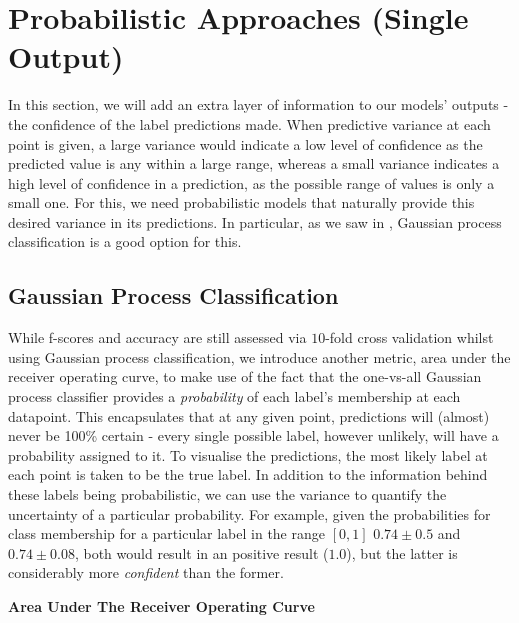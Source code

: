 \section{Probabilistic Approaches (Single Output)}

In this section, we will add an extra layer of information to our models' outputs - the confidence of the label predictions made. When predictive variance at each point is given, a large variance would indicate a low level of confidence as the predicted value is any within a large range, whereas a small variance indicates a high level of confidence in a prediction, as the possible range of values is only a small one. For this, we need probabilistic models that naturally provide this desired variance in its predictions. In particular, as we saw in , Gaussian process classification is a good option for this.

\subsection{Gaussian Process Classification}

While f-scores and accuracy are still assessed via $10$-fold cross validation whilst using Gaussian process classification, we introduce another metric, area under the receiver operating curve, to make use of the fact that the one-vs-all Gaussian process classifier provides a \textit{probability} of each label's membership at each datapoint. This encapsulates that at any given point, predictions will (almost) never be 100\% certain - every single possible label, however unlikely, will have a probability assigned to it. To visualise the predictions, the most likely label at each point is taken to be the true label. In addition to the information behind these labels being probabilistic, we can use the variance to quantify the uncertainty of a particular probability. For example, given the probabilities for class membership for a particular label in the range $[0,1]$ $0.74 \pm 0.5$ and $0.74 \pm 0.08$, both would result in an positive result ($1.0$), but the latter is considerably more \textit{confident} than the former.

 \textbf{Area Under The Receiver Operating Curve}

